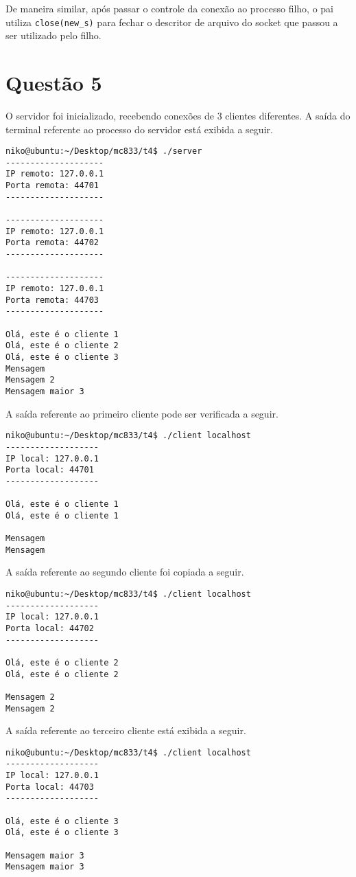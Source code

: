 \documentclass[a4paper,10pt]{article}
\begin{document}
De maneira similar, após passar o controle da conexão ao processo filho, o pai utiliza {\tt close(new\_s)} para fechar o descritor de arquivo do socket que passou a ser utilizado pelo filho.

\section{Questão 5}
O servidor foi inicializado, recebendo conexões de 3 clientes diferentes. A saída do terminal referente ao processo do servidor está exibida a seguir.

\begin{lstlisting}
niko@ubuntu:~/Desktop/mc833/t4$ ./server 
--------------------
IP remoto: 127.0.0.1
Porta remota: 44701
--------------------

--------------------
IP remoto: 127.0.0.1
Porta remota: 44702
--------------------

--------------------
IP remoto: 127.0.0.1
Porta remota: 44703
--------------------

Olá, este é o cliente 1
Olá, este é o cliente 2
Olá, este é o cliente 3
Mensagem
Mensagem 2
Mensagem maior 3

\end{lstlisting}

A saída referente ao primeiro cliente pode ser verificada a seguir.

\begin{lstlisting}
niko@ubuntu:~/Desktop/mc833/t4$ ./client localhost
-------------------
IP local: 127.0.0.1
Porta local: 44701
-------------------

Olá, este é o cliente 1
Olá, este é o cliente 1

Mensagem
Mensagem

\end{lstlisting}

A saída referente ao segundo cliente foi copiada a seguir.

\begin{lstlisting}
niko@ubuntu:~/Desktop/mc833/t4$ ./client localhost
-------------------
IP local: 127.0.0.1
Porta local: 44702
-------------------

Olá, este é o cliente 2
Olá, este é o cliente 2

Mensagem 2
Mensagem 2

\end{lstlisting}

A saída referente ao terceiro cliente está exibida a seguir.

\begin{lstlisting}
niko@ubuntu:~/Desktop/mc833/t4$ ./client localhost
-------------------
IP local: 127.0.0.1
Porta local: 44703
-------------------

Olá, este é o cliente 3
Olá, este é o cliente 3

Mensagem maior 3
Mensagem maior 3


\end{lstlisting}
\end{document}
